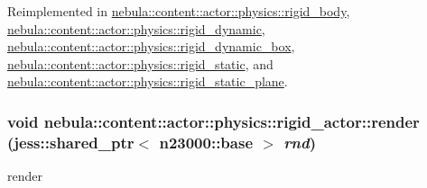 Reimplemented in \hyperlink{classnebula_1_1content_1_1actor_1_1physics_1_1rigid__body_afeaa8197cacc9b3f9e2b618f0ee0443b}{nebula::content::actor::physics::rigid\_\-body}, \hyperlink{classnebula_1_1content_1_1actor_1_1physics_1_1rigid__dynamic_a115e82dbc90ce5ae9f8d41724f1bd44d}{nebula::content::actor::physics::rigid\_\-dynamic}, \hyperlink{classnebula_1_1content_1_1actor_1_1physics_1_1rigid__dynamic__box_a26c54eacc3d28dd0b88e7a67fe6635f7}{nebula::content::actor::physics::rigid\_\-dynamic\_\-box}, \hyperlink{classnebula_1_1content_1_1actor_1_1physics_1_1rigid__static_ae32ba52ca54bc1cc78572b931a98600d}{nebula::content::actor::physics::rigid\_\-static}, and \hyperlink{classnebula_1_1content_1_1actor_1_1physics_1_1rigid__static__plane_a507d6d75754916f23d673205d53b3874}{nebula::content::actor::physics::rigid\_\-static\_\-plane}.\hypertarget{classnebula_1_1content_1_1actor_1_1physics_1_1rigid__actor_af9f27bb90193c5a85a3572ef15009bf7}{
\subsubsection[{render}]{\setlength{\rightskip}{0pt plus 5cm}void nebula::content::actor::physics::rigid\_\-actor::render (jess::shared\_\-ptr$<$ {\bf n23000::base} $>$ {\em rnd})}}
\label{classnebula_1_1content_1_1actor_1_1physics_1_1rigid__actor_af9f27bb90193c5a85a3572ef15009bf7}


render 

